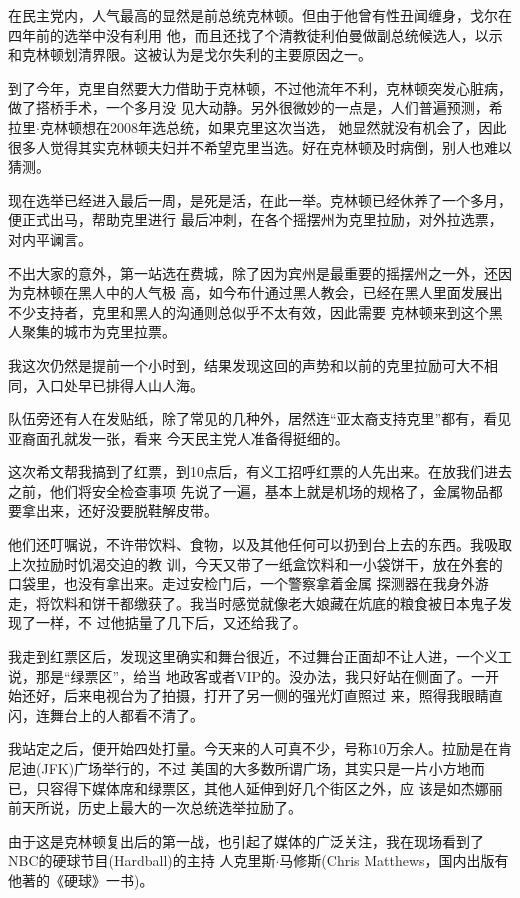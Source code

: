 ﻿\documentclass[11pt]{article}
\begin{document}
在民主党内，人气最高的显然是前总统克林顿。但由于他曾有性丑闻缠身，戈尔在四年前的选举中没有利用
他，而且还找了个清教徒利伯曼做副总统候选人，以示和克林顿划清界限。这被认为是戈尔失利的主要原因之一。

到了今年，克里自然要大力借助于克林顿，不过他流年不利，克林顿突发心脏病，做了搭桥手术，一个多月没
见大动静。另外很微妙的一点是，人们普遍预测，希拉里$\cdot$克林顿想在2008年选总统，如果克里这次当选，
她显然就没有机会了，因此很多人觉得其实克林顿夫妇并不希望克里当选。好在克林顿及时病倒，别人也难以猜测。

现在选举已经进入最后一周，是死是活，在此一举。克林顿已经休养了一个多月，便正式出马，帮助克里进行
最后冲刺，在各个摇摆州为克里拉励，对外拉选票，对内平谰言。

不出大家的意外，第一站选在费城，除了因为宾州是最重要的摇摆州之一外，还因为克林顿在黑人中的人气极
高，如今布什通过黑人教会，已经在黑人里面发展出不少支持者，克里和黑人的沟通则总似乎不太有效，因此需要
克林顿来到这个黑人聚集的城市为克里拉票。

我这次仍然是提前一个小时到，结果发现这回的声势和以前的克里拉励可大不相同，入口处早已排得人山人海。

队伍旁还有人在发贴纸，除了常见的几种外，居然连``亚太裔支持克里''都有，看见亚裔面孔就发一张，看来
今天民主党人准备得挺细的。

这次希文帮我搞到了红票，到10点后，有义工招呼红票的人先出来。在放我们进去之前，他们将安全检查事项
先说了一遍，基本上就是机场的规格了，金属物品都要拿出来，还好没要脱鞋解皮带。

他们还叮嘱说，不许带饮料、食物，以及其他任何可以扔到台上去的东西。我吸取上次拉励时饥渴交迫的教
训，今天又带了一纸盒饮料和一小袋饼干，放在外套的口袋里，也没有拿出来。走过安检门后，一个警察拿着金属
探测器在我身外游走，将饮料和饼干都缴获了。我当时感觉就像老大娘藏在炕底的粮食被日本鬼子发现了一样，不
过他掂量了几下后，又还给我了。

我走到红票区后，发现这里确实和舞台很近，不过舞台正面却不让人进，一个义工说，那是``绿票区''，给当
地政客或者VIP的。没办法，我只好站在侧面了。一开始还好，后来电视台为了拍摄，打开了另一侧的强光灯直照过
来，照得我眼睛直闪，连舞台上的人都看不清了。

我站定之后，便开始四处打量。今天来的人可真不少，号称10万余人。拉励是在肯尼迪(JFK)广场举行的，不过
美国的大多数所谓广场，其实只是一片小方地而已，只容得下媒体席和绿票区，其他人延伸到好几个街区之外，应
该是如杰娜丽前天所说，历史上最大的一次总统选举拉励了。

由于这是克林顿复出后的第一战，也引起了媒体的广泛关注，我在现场看到了NBC的硬球节目(Hardball)的主持
人克里斯$\cdot$马修斯(Chris Matthews，国内出版有他著的《硬球》一书)。
\end{document}
